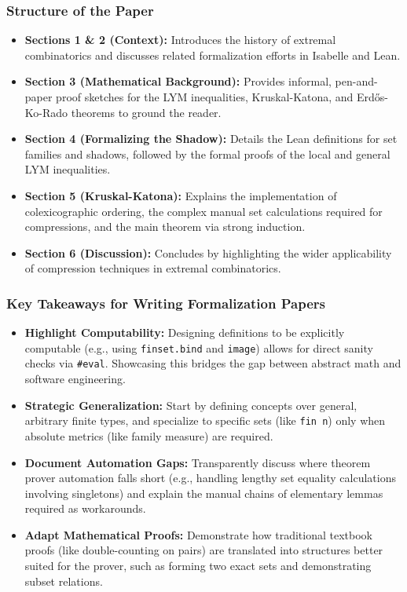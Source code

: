 \documentclass{article}
\begin{document}
\subsubsection{Structure of the Paper}
\begin{itemize}
    \item \textbf{Sections 1 \& 2 (Context):} Introduces the history of extremal combinatorics and discusses related formalization efforts in Isabelle and Lean.
    \item \textbf{Section 3 (Mathematical Background):} Provides informal, pen-and-paper proof sketches for the LYM inequalities, Kruskal-Katona, and Erd\H{o}s-Ko-Rado theorems to ground the reader.
    \item \textbf{Section 4 (Formalizing the Shadow):} Details the Lean definitions for set families and shadows, followed by the formal proofs of the local and general LYM inequalities.
    \item \textbf{Section 5 (Kruskal-Katona):} Explains the implementation of colexicographic ordering, the complex manual set calculations required for compressions, and the main theorem via strong induction.
    \item \textbf{Section 6 (Discussion):} Concludes by highlighting the wider applicability of compression techniques in extremal combinatorics.
\end{itemize}

\subsubsection{Key Takeaways for Writing Formalization Papers}
\begin{itemize}
    \item \textbf{Highlight Computability:} Designing definitions to be explicitly computable (e.g., using \texttt{finset.bind} and \texttt{image}) allows for direct sanity checks via \texttt{\#eval}. Showcasing this bridges the gap between abstract math and software engineering.
    \item \textbf{Strategic Generalization:} Start by defining concepts over general, arbitrary finite types, and specialize to specific sets (like \texttt{fin n}) only when absolute metrics (like family measure) are required.
    \item \textbf{Document Automation Gaps:} Transparently discuss where theorem prover automation falls short (e.g., handling lengthy set equality calculations involving singletons) and explain the manual chains of elementary lemmas required as workarounds.
    \item \textbf{Adapt Mathematical Proofs:} Demonstrate how traditional textbook proofs (like double-counting on pairs) are translated into structures better suited for the prover, such as forming two exact sets and demonstrating subset relations.
\end{itemize}
\end{document}
